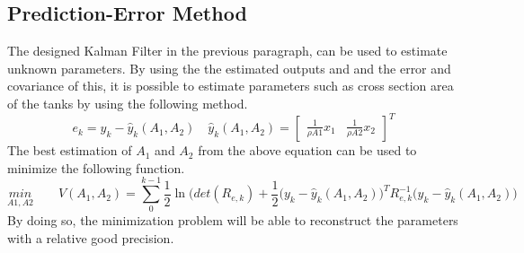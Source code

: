 \subsection{Prediction-Error Method}
The designed Kalman Filter in the previous paragraph, can be used to estimate unknown parameters. By using the the estimated outputs and and the error and covariance of this, it is possible to estimate parameters such as cross section area of the tanks by using the following method.
\begin{equation}
    e_k=y_k-\hat{y}_k(A_1,A_2)\quad\hat{y}_k(A_1,A_2)=\begin{bmatrix} \frac{1}{\rho A1}x_1 & \frac{1}{\rho A2}x_2\end{bmatrix}^T
\end{equation}
The best estimation of $A_1$ and $A_2$ from the above equation can be used to minimize the following function.
\begin{equation}
    \underset{A1,A2}{min}\qquad V(A_1,A_2)=\sum_0^{k-1}\frac{1}{2}\ln{}(det(R_{e,k})+\frac{1}{2}\Big(y_k-\hat{y}_k(A_1,A_2)\Big)^TR_{e,k}^{-1}\Big(y_k-\hat{y}_k(A_1,A_2)\Big)
\end{equation}
By doing so, the minimization problem will be able to reconstruct the parameters with a relative good precision.
